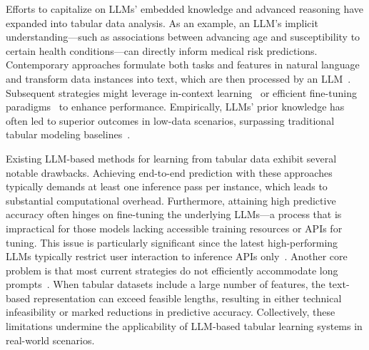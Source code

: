 Efforts to capitalize on LLMs’ embedded knowledge and advanced reasoning have expanded into tabular data analysis. As an example, an LLM’s implicit understanding—such as associations between advancing age and susceptibility to certain health conditions—can directly inform medical risk predictions. Contemporary approaches formulate both tasks and features in natural language and transform data instances into text, which are then processed by an LLM~\cite{dinh2022lift,wang2023anypredict}. Subsequent strategies might leverage in-context learning~\cite{nam2023semi} or efficient fine-tuning paradigms~\cite{dinh2022lift,hegselmann2023tabllm} to enhance performance. Empirically, LLMs’ prior knowledge has often led to superior outcomes in low-data scenarios, surpassing traditional tabular modeling baselines~\cite{hegselmann2023tabllm}.

Existing LLM-based methods for learning from tabular data exhibit several notable drawbacks. Achieving end-to-end prediction with these approaches typically demands at least one inference pass per instance, which leads to substantial computational overhead. Furthermore, attaining high predictive accuracy often hinges on fine-tuning the underlying LLMs—a process that is impractical for those models lacking accessible training resources or APIs for tuning. This issue is particularly significant since the latest high-performing LLMs typically restrict user interaction to inference APIs only~\cite{anil2023palm,openai2023gpt4}. Another core problem is that most current strategies do not efficiently accommodate long prompts~\cite{liu2023lost}. When tabular datasets include a large number of features, the text-based representation can exceed feasible lengths, resulting in either technical infeasibility or marked reductions in predictive accuracy. Collectively, these limitations undermine the applicability of LLM-based tabular learning systems in real-world scenarios.

